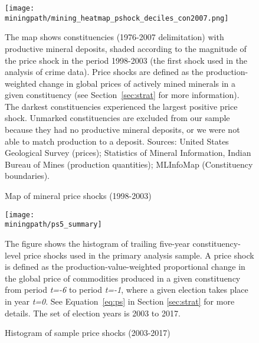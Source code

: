 \newpage
\begin{figure}[H]\caption{Map of mineral price shocks (1998-2003)}
  \begin{center}
    \hspace*{-0.9in}
    \texttt{[image: \\miningpath/mining\_heatmap\_pshock\_deciles\_con2007.png]} 
    \label{fig:shock_map}
  \end{center}
  \footnotesize{The map shows constituencies (1976-2007
    delimitation) with productive mineral deposits, shaded
    according to the magnitude of the price shock in the period
    1998-2003 (the first shock used in the analysis of crime
    data). Price shocks are defined as the production-weighted
    change in global prices of actively mined minerals in a given
    constituency (see Section~\ref{sec:strat} for more
    information).  The darkest constituencies experienced the
    largest positive price shock.  Unmarked constituencies are
    excluded from our sample because they had no productive mineral
    deposits, or we were not able to match production to a
    deposit. Sources: United States Geological Survey (prices);
    Statistics of Mineral Information, Indian Bureau of Mines
    (production quantities); MLInfoMap (Constituency boundaries).}
\end{figure}

\newpage
\begin{figure}[H]\caption{Histogram of sample price shocks (2003-2017)}
  \begin{center}
    \hspace*{-0.9in}
    \texttt{[image: \\miningpath/ps5\_summary]} 
    \label{fig:ps5_hist}
  \end{center}
  \footnotesize{The figure shows the histogram of trailing five-year
    constituency-level price shocks used in the primary analysis
    sample. A price shock is defined as the
    production-value-weighted proportional change in the global
    price of commodities produced in a given constituency from
    period \textit{t=-6} to period \textit{t=-1}, where a given
    election takes place in year \textit{t=0}. See
    Equation~\ref{eq:ps} in Section \ref{sec:strat} for more
    details. The set of election years is 2003 to 2017.}
\end{figure}
